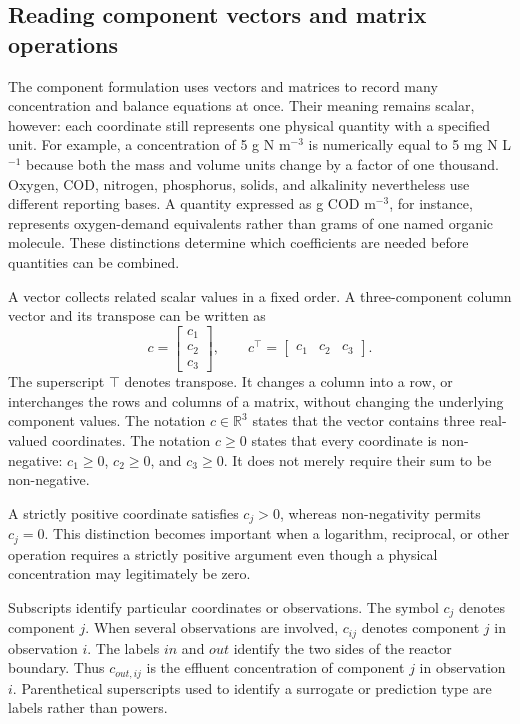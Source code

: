 \subsection{Reading component vectors and matrix operations}

The component formulation uses vectors and matrices to record many concentration and balance equations at once. Their meaning remains scalar, however: each coordinate still represents one physical quantity with a specified unit. For example, a concentration of 5 g N m$^{-3}$ is numerically equal to 5 mg N L$^{-1}$ because both the mass and volume units change by a factor of one thousand. Oxygen, COD, nitrogen, phosphorus, solids, and alkalinity nevertheless use different reporting bases. A quantity expressed as g COD m$^{-3}$, for instance, represents oxygen-demand equivalents rather than grams of one named organic molecule. These distinctions determine which coefficients are needed before quantities can be combined.

A vector collects related scalar values in a fixed order. A three-component column vector and its transpose can be written as
\[
c=\begin{bmatrix}c_1\\c_2\\c_3\end{bmatrix},\qquad
c^\top=\begin{bmatrix}c_1&c_2&c_3\end{bmatrix}.
\]
The superscript $\top$ denotes transpose. It changes a column into a row, or interchanges the rows and columns of a matrix, without changing the underlying component values. The notation $c\in\mathbb{R}^3$ states that the vector contains three real-valued coordinates. The notation $c\geq0$ states that every coordinate is non-negative: $c_1\geq0$, $c_2\geq0$, and $c_3\geq0$. It does not merely require their sum to be non-negative.

A strictly positive coordinate satisfies $c_j>0$, whereas non-negativity permits $c_j=0$. This distinction becomes important when a logarithm, reciprocal, or other operation requires a strictly positive argument even though a physical concentration may legitimately be zero.

Subscripts identify particular coordinates or observations. The symbol $c_j$ denotes component $j$. When several observations are involved, $c_{ij}$ denotes component $j$ in observation $i$. The labels $in$ and $out$ identify the two sides of the reactor boundary. Thus $c_{out,ij}$ is the effluent concentration of component $j$ in observation $i$. Parenthetical superscripts used to identify a surrogate or prediction type are labels rather than powers.

